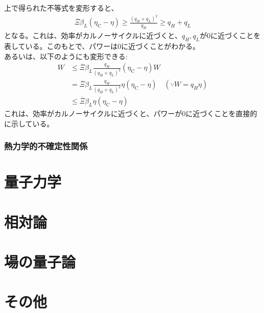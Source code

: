 \documentclass[a4paper,11pt]{jsarticle}
\numberwithin{equation}{section}
\begin{document}
上で得られた不等式を変形すると、
\begin{align}
  \overline{\Xi} \beta_L(\eta_{\text{C}} - \eta) \geq \frac{(q_H + q_L)^2}{q_H} \geq q_H + q_L
\end{align}
となる。これは、効率がカルノーサイクルに近づくと、$q_H, q_L$が0に近づくことを表している。このもとで、パワーは0に近づくことがわかる。\\
あるいは、以下のようにも変形できる:
\begin{align}
  W &\leq \overline{\Xi} \beta_L\frac{q_H}{(q_H + q_L)^2}(\eta_{\text{C}} - \eta)W\\
  &= \overline{\Xi} \beta_L\frac{q_H}{(q_H + q_L)^2}\eta(\eta_{\text{C}} - \eta)\quad (\because W = q_H \eta)\\
    &\leq \overline{\Xi} \beta_L\eta(\eta_{\text{C}} - \eta)
\end{align}
これは、効率がカルノーサイクルに近づくと、パワーが0に近づくことを直接的に示している。\\

\subsubsection{熱力学的不確定性関係}

\section{量子力学}

\section{相対論}

\section{場の量子論}

\section{その他}
\end{document}

